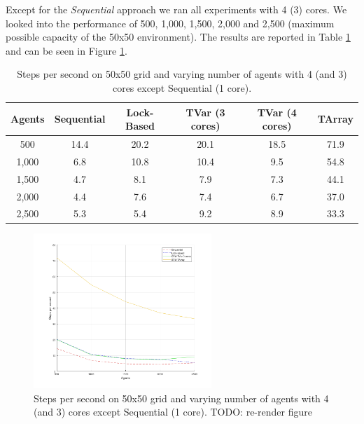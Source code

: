 Except for the \textit{Sequential} approach we ran all experiments with 4 (3) cores. We looked into the performance of 500, 1,000, 1,500, 2,000 and 2,500 (maximum possible capacity of the 50x50 environment). The results are reported in Table \ref{tab:state_results_agentsscale_time} and can be seen in Figure \ref{fig:state_results_agentsscale_time}.

\begin{table}
	\centering
  	\begin{tabular}{ c || c | c | c | c | c }
        Agents  & Sequential & Lock-Based & TVar (3 cores) & TVar (4 cores) & TArray  \\ \hline \hline 
    	500     & 14.4       & 20.2		  &	20.1           & 18.5       	& 71.9    \\ \hline
   		1,000   & 6.8        & 10.8 	  & 10.4           & 9.5       	    & 54.8    \\ \hline
   		1,500   & 4.7        & 8.1 		  & 7.9            & 7.3			& 44.1    \\ \hline
   		2,000   & 4.4        & 7.6 		  & 7.4            & 6.7    		& 37.0    \\ \hline 
   		2,500   & 5.3        & 5.4 		  & 9.2            & 8.9			& 33.3
   	\end{tabular}
  	
  	\caption{Steps per second on 50x50 grid and varying number of agents with 4 (and 3) cores except Sequential (1 core).}
	\label{tab:state_results_agentsscale_time}
\end{table}

\begin{figure}
	\centering
	\includegraphics[width=0.6\textwidth, angle=0]{./fig/sugarscape/varying_agents.png}
	\caption{Steps per second on 50x50 grid and varying number of agents with 4 (and 3) cores except Sequential (1 core). TODO: re-render figure}
	\label{fig:state_results_agentsscale_time}
\end{figure}

